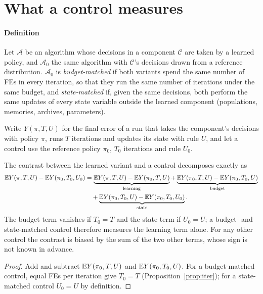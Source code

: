 \section{What a control measures}
\label{sec:control}

\paragraph{Definition} Let $\mathcal A$ be an algorithm whose decisions in a component $\mathcal C$ are taken by a learned
policy, and $\mathcal A_0$ the same algorithm with $\mathcal C$'s decisions drawn from a reference distribution.
$\mathcal A_0$ is \emph{budget-matched} if both variants spend the same number of FEs in every iteration, so that they run
the same number of iterations under the same budget, and \emph{state-matched} if, given the same decisions, both perform
the same updates of every state variable outside the learned component (populations, memories, archives, parameters).

Write $Y(\pi,T,U)$ for the final error of a run that takes the component's decisions with policy $\pi$, runs $T$ iterations
and updates its state with rule $U$, and let a control use the reference policy $\pi_0$, $T_0$ iterations and rule $U_0$.

\begin{proposition}
\label{prop:identify}
The contrast between the learned variant and a control decomposes exactly as
\begin{equation}
\begin{aligned}
\mathbb{E} Y(\pi,T,U)-\mathbb{E} Y(\pi_0,T_0,U_0)
&=\underbrace{\mathbb{E} Y(\pi,T,U)-\mathbb{E} Y(\pi_0,T,U)}_{\text{learning}}
+\underbrace{\mathbb{E} Y(\pi_0,T,U)-\mathbb{E} Y(\pi_0,T_0,U)}_{\text{budget}}\\
&\quad+\underbrace{\mathbb{E} Y(\pi_0,T_0,U)-\mathbb{E} Y(\pi_0,T_0,U_0)}_{\text{state}} .
\end{aligned}
\label{eq:identify}
\end{equation}
The budget term vanishes if $T_0=T$ and the state term if $U_0=U$; a budget- and state-matched control therefore measures
the learning term alone. For any other control the contrast is biased by the sum of the two other terms, whose sign is not
known in advance.
\end{proposition}
\begin{proof}
Add and subtract $\mathbb{E} Y(\pi_0,T,U)$ and $\mathbb{E} Y(\pi_0,T_0,U)$. For a budget-matched control, equal FEs per iteration give
$T_0=T$ (Proposition~\ref{prop:iter}); for a state-matched control $U_0=U$ by definition.
\end{proof}

